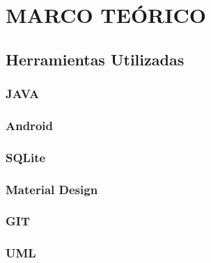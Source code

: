 \chapter{MARCO TEÓRICO}
\section{Herramientas Utilizadas}
\subsection{JAVA}

\subsection{Android}

\subsection{SQLite}

\subsection{Material Design}

\subsection{GIT}

\subsection{UML}